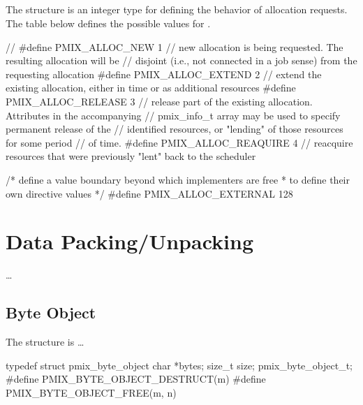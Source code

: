 \subsection{}

The  structure is an integer type for defining the behavior of allocation requests.
The table below defines the possible values for .

\cspecificstart
\begin{codepar}
//
#define PMIX_ALLOC_NEW          1  // new allocation is being requested. The resulting allocation will be
                                   // disjoint (i.e., not connected in a job sense) from the requesting allocation
#define PMIX_ALLOC_EXTEND       2  // extend the existing allocation, either in time or as additional resources
#define PMIX_ALLOC_RELEASE      3  // release part of the existing allocation. Attributes in the accompanying
                                   // pmix\_info\_t array may be used to specify permanent release of the
                                   // identified resources, or "lending" of those resources for some period
                                   // of time.
#define PMIX_ALLOC_REAQUIRE     4  // reacquire resources that were previously "lent" back to the scheduler

/* define a value boundary beyond which implementers are free
 * to define their own directive values */
#define PMIX_ALLOC_EXTERNAL     128
\end{codepar}
\cspecificend


\section{Data Packing/Unpacking}

\ldots

\subsection{Byte Object}

The  structure is \ldots

\cspecificstart
\begin{codepar}
typedef struct pmix_byte_object {
    char *bytes;
    size_t size;
} pmix_byte_object_t;
#define PMIX_BYTE_OBJECT_DESTRUCT(m)
#define PMIX_BYTE_OBJECT_FREE(m, n)
\end{codepar}
\cspecificend

